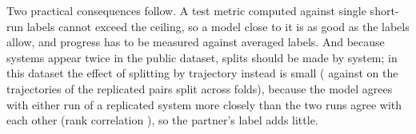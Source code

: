 \documentclass[journal=jcisd8,manuscript=article,email=true]{achemso}
\begin{document}
Two practical consequences follow. A test metric computed against single short-run labels cannot
exceed the ceiling, so a model close to it is as good as the labels allow, and progress has to be
measured against averaged labels. And because \techoNRep{} systems appear twice in the public
dataset, splits should be made by system; in this dataset the effect of splitting by trajectory
instead is small (\mlLeakTraj{} against \mlLeakSys{} on the \mlLeakN{} trajectories of the
\mlLeakPairs{} replicated pairs split across folds), because the model agrees with either run of a replicated system more closely than the two runs
agree with each other (rank correlation \RepEndRho), so the partner's label adds little.


\begin{table}[ht]
\centering
\caption{Noise ceiling of short-run labels in the screening population: reliability of the mean of
$n$ runs, maximum correlation of a perfect predictor with that label, and recall of the truly best
systems when selecting by it.}\label{tab:ceiling}
{\footnotesize}
\end{table}

\begin{table}[ht]
\centering
\caption{Out-of-sample correlation of a random forest on monomer fingerprints with short-run
labels (cross-validation split by system, or by chemical family of the monomer), against the
noise ceiling of each label. The ceilings and their intervals rest on the run-to-run noise of
the \nRep{} replicated systems, not on the \mlNSys{} systems of the first rows.}\label{tab:ml}
\resizebox{\textwidth}{!}{}
\end{table}
\end{document}
